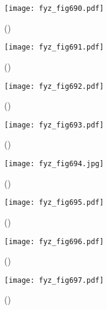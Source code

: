     \begin{figure}[ht!] %
      \centering
      \texttt{[image: fyz\_fig690.pdf]}
      \caption{
               (\cite[s.~707]{Feynman02})}
      \label{fyz_fig690}
    \end{figure}

    \begin{figure}[ht!] %
      \centering
      \texttt{[image: fyz\_fig691.pdf]}
      \caption{
               (\cite[s.~707]{Feynman02})}
      \label{fyz_fig691}
    \end{figure}


    \begin{figure}[ht!] %
      \centering
      \texttt{[image: fyz\_fig692.pdf]}
      \caption{
               (\cite[s.~707]{Feynman02})}
      \label{fyz_fig692}
    \end{figure}

    \begin{figure}[ht!] %
      \centering
      \texttt{[image: fyz\_fig693.pdf]}
      \caption{
               (\cite[s.~707]{Feynman02})}
      \label{fyz_fig693}
    \end{figure}

    \begin{figure}[ht!] %
      \centering
      \texttt{[image: fyz\_fig694.jpg]}
      \caption{
               (\cite[s.~707]{Feynman02})}
      \label{fyz_fig694}
    \end{figure}

    \begin{figure}[ht!] %
      \centering
      \texttt{[image: fyz\_fig695.pdf]}
      \caption{
               (\cite[s.~707]{Feynman02})}
      \label{fyz_fig695}
    \end{figure}

    \begin{figure}[ht!] %
      \centering
      \texttt{[image: fyz\_fig696.pdf]}
      \caption{
               (\cite[s.~707]{Feynman02})}
      \label{fyz_fig696}
    \end{figure}

    \begin{figure}[ht!] %
      \centering
      \texttt{[image: fyz\_fig697.pdf]}
      \caption{
               (\cite[s.~707]{Feynman02})}
      \label{fyz_fig697}
    \end{figure}

